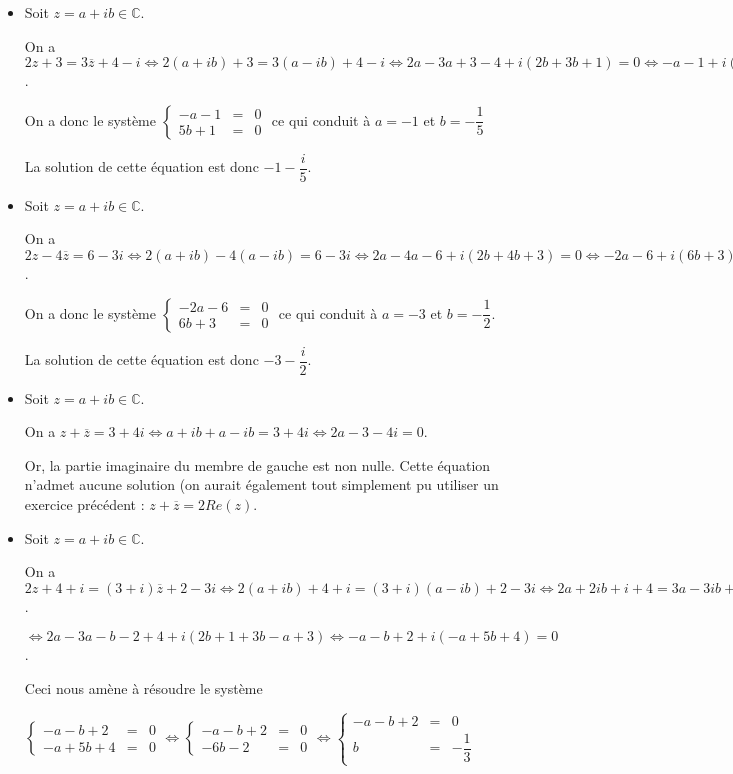 \documentclass[11pt,fleqn, openany]{book} %
\begin{document}
\begin{solution}
\begin{itemize}
\item Soit \(z=a+ib\in\mathbb{C}\). 

On a \(2z+3=3\overline{z}+4-i \Leftrightarrow 2(a+ib)+3=3(a-ib)+4-i \Leftrightarrow 2a-3a+3-4+i(2b+3b+1)=0 \Leftrightarrow -a-1 +i(5b+1)=0\).

On a donc le système \(\left\{\begin{array}{rcl}-a-1&=&0 \\ 5b+1&=&0\end{array}\right.\) ce qui conduit à \(a=-1\) et \(b=-\dfrac{1}{5}\)

La solution de cette équation est donc \(-1-\dfrac{i}{5}\).
\vskip5pt
\item Soit \(z=a+ib\in\mathbb{C}\). 

On a \(2z-4\overline{z}= 6-3i \Leftrightarrow 2(a+ib)-4(a-ib)=6-3i \Leftrightarrow 2a-4a-6+i(2b+4b+3) = 0 \Leftrightarrow -2a-6+i(6b+3)=0\).

On a donc le système \(\left\{\begin{array}{rcl}-2a-6&=&0 \\ 6b+3 &=&0\end{array}\right.\) ce qui conduit à \(a=-3\) et \(b=-\dfrac{1}{2}\).

La solution de cette équation est donc \(-3-\dfrac{i}{2}\).
\vskip5pt
\item Soit \(z=a+ib\in\mathbb{C}\).  

On a \(z+\overline{z}=3+4i \Leftrightarrow a+ib+a-ib=3+4i \Leftrightarrow 2a-3-4i = 0\).

Or, la partie imaginaire du membre de gauche est non nulle. Cette équation n'admet aucune solution (on aurait également tout simplement pu utiliser un exercice précédent : \(z+\overline{z} = 2Re(z)\).
\vskip5pt
\item Soit \(z=a+ib\in\mathbb{C}\). 

On a \(2z+4+i=(3+i)\overline{z}+2-3i \Leftrightarrow 2(a+ib)+4+i=(3+i)(a-ib)+2-3i \Leftrightarrow 2a+2ib+i+4=3a-3ib+ia+b+2-3i\).

\(\Leftrightarrow 2a-3a -b-2+4 +i(2b+1+3b-a+3) \Leftrightarrow -a-b+2+i(-a+5b+4)=0\).

Ceci nous amène à résoudre le système 

\(\left\{\begin{array}{rcl}-a-b+2&=&0 \\ -a+5b+4 &=&0\end{array}\right. \Leftrightarrow \left\{\begin{array}{rcl}-a-b+2&=&0 \\ -6b-2 &=&0\end{array}\right. \Leftrightarrow \left\{\begin{array}{rcl}-a-b+2&=&0 \\ b &=& - \dfrac{1}{3} \end{array}\right.\)


\end{itemize}
\end{solution}
\end{document}
